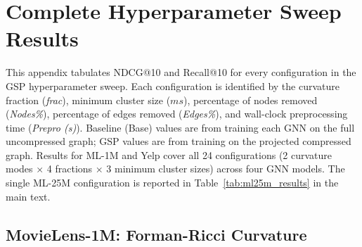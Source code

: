 \chapter{Complete Hyperparameter Sweep Results}
\label{app:sweep}

This appendix tabulates NDCG@10 and Recall@10 for every configuration in the GSP hyperparameter sweep. Each configuration is identified by the curvature fraction (\textit{frac}), minimum cluster size ($ms$), percentage of nodes removed (\textit{Nodes\%}), percentage of edges removed (\textit{Edges\%}), and wall-clock preprocessing time (\textit{Prepro (s)}). Baseline (Base) values are from training each GNN on the full uncompressed graph; GSP values are from training on the projected compressed graph. Results for ML-1M and Yelp cover all 24 configurations (2 curvature modes $\times$ 4 fractions $\times$ 3 minimum cluster sizes) across four GNN models. The single ML-25M configuration is reported in Table~\ref{tab:ml25m_results} in the main text.

\section{MovieLens-1M: Forman-Ricci Curvature}

